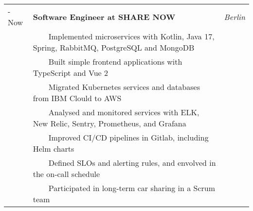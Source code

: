 \documentclass{article}
\newcommand{\tabitem}{~~\llap{\textbullet}~~}
\begin{document}
\begin{tabularx}{\textwidth}{
        >{\hsize=0.5\hsize}X
        >{\hsize=2\hsize}X
        >{\raggedleft\arraybackslash\hsize=0.5\hsize}X
    }
    03.2020 - Now     & \textbf{Software Engineer at SHARE NOW}                                                           & \textit{Berlin} \\[4pt]
                      & \tabitem Implemented microservices with Kotlin, Java 17, Spring, RabbitMQ, PostgreSQL and MongoDB                   \\
                      & \tabitem Built simple frontend applications with TypeScript and Vue 2                                               \\
                      & \tabitem Migrated Kubernetes services and databases from IBM Clould to AWS                                          \\
                      & \tabitem Analysed and monitored services with ELK, New Relic, Sentry, Prometheus, and Grafana                       \\
                      & \tabitem Improved CI/CD pipelines in Gitlab, including Helm charts                                                  \\
                      & \tabitem Defined SLOs and alerting rules, and envolved in the on-call schedule                                      \\
                      & \tabitem Participated in long-term car sharing in a Scrum team                                                      \\[8pt]


\end{tabularx}
\end{document}

